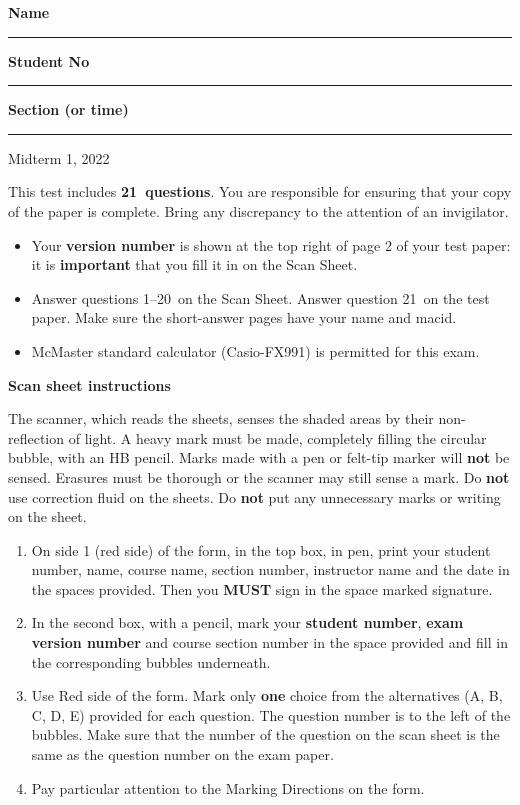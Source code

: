 \documentclass[12pt]{article}
\def\midterm{1}
\def\year{2022}
\def\questions{21}
\def\mc{1--20}
\def\saq{question 21}
\begin{document}
\noindent \textbf{Name} \rule{5cm}{1pt} \hfill \textbf{Student No} \rule{5cm}{1pt}

\noindent
\textbf{Section (or time)} \rule{5cm}{1pt}

\bigskip

{ \par}
{\centering Midterm \midterm, \year\par}

\parindent0pt

\vfill

This test includes {\bf \questions\ questions}. You are responsible for ensuring that your copy of the paper is complete. Bring any discrepancy to the attention of an invigilator. 

\vfill

\begin{itemize}
\item Your \textbf{version number} is shown at the top right of page 2 of your test paper: it is \textbf{important} that you fill it in on the Scan Sheet.
\item Answer questions \mc\ on the Scan Sheet. Answer \saq\ on the test paper. Make sure the short-answer pages have your name and macid.
\item McMaster standard calculator (Casio-FX991) is permitted for this exam.
\end{itemize}

\vfill

\textbf{Scan sheet instructions}

\small{
The scanner, which reads the sheets, senses the shaded areas by their non-reflection of light. A heavy mark must be made, completely filling the circular bubble, with an HB pencil. Marks made with a pen or felt-tip marker will \textbf{not} be sensed. Erasures must be thorough or the scanner may still sense a mark. Do \textbf{not} use correction fluid on the sheets. Do \textbf{not} put any unnecessary marks or writing on the sheet.

\begin{enumerate}
\item On side 1 (red side) of the form, in the top box, in pen, print your student number, name, course name, section number, instructor name and the date in the spaces provided. Then you {\bf MUST} sign in the space marked signature.

\item In the second box, with a pencil, mark your {\bf student number}, {\bf exam version number} and course section number in the space provided and fill in the corresponding bubbles underneath.

\item Use Red side of the form. Mark only {\bf one} choice from the alternatives (A, B, C, D, E) provided for each question. The question number is to the left of the bubbles. Make sure that the number of the question on the scan sheet is the same as the question number on the exam paper.
\item  Pay particular attention to the Marking Directions on the form.
\end{enumerate}
}

\vfill
{ \par}
\end{document}
